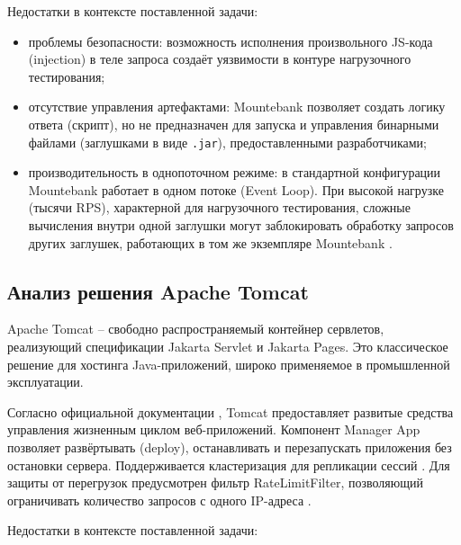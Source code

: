 Недостатки в контексте поставленной задачи:

\begin{itemize}
\item проблемы безопасности: возможность исполнения произвольного JS-кода (injection) в теле запроса создаёт уязвимости в контуре нагрузочного тестирования;
\item отсутствие управления артефактами: Mountebank позволяет создать логику ответа (скрипт), но не предназначен для запуска и управления бинарными файлами (заглушками в виде \texttt{.jar}), предоставленными разработчиками;
\item производительность в однопоточном режиме: в стандартной конфигурации Mountebank работает в одном потоке (Event Loop). При высокой нагрузке (тысячи RPS), характерной для нагрузочного тестирования, сложные вычисления внутри одной заглушки могут заблокировать обработку запросов других заглушек, работающих в том же экземпляре Mountebank \cite{mountebank}.
\end{itemize}

\subsection{Анализ решения Apache Tomcat}

Apache Tomcat -- свободно распространяемый контейнер сервлетов, реализующий спецификации Jakarta Servlet и Jakarta Pages. Это классическое решение для хостинга Java-приложений, широко применяемое в промышленной эксплуатации.

Согласно официальной документации \cite{tomcat}, Tomcat предоставляет развитые средства управления жизненным циклом веб-приложений. Компонент Manager App позволяет развёртывать (deploy), останавливать и перезапускать приложения без остановки сервера. Поддерживается кластеризация для репликации сессий \cite{tomcat-cluster}. Для защиты от перегрузок предусмотрен фильтр RateLimitFilter, позволяющий ограничивать количество запросов с одного IP-адреса \cite{tomcat-ratelimit}.

Недостатки в контексте поставленной задачи:


